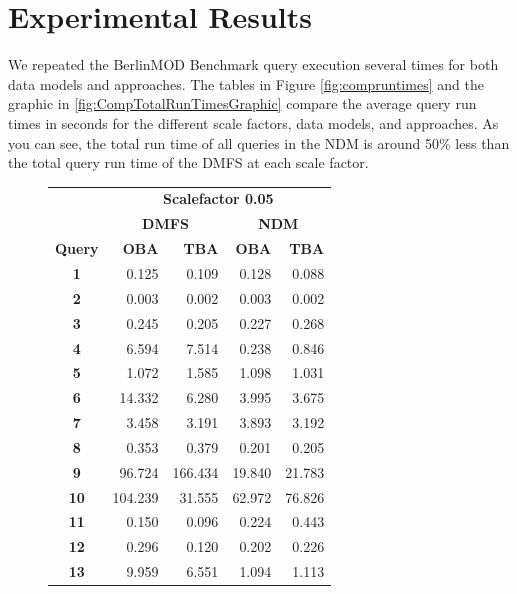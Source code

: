 \documentclass[a4paper]{article}
\newcommand{\bmodb} {BerlinMOD Benchmark}
\begin{document}
{\section{Experimental Results}
\label{sec:results}
We repeated the \bmodb{} query execution several times for both data models and
approaches. The tables in Figure \ref{fig:compruntimes} and the graphic in
\ref{fig:CompTotalRunTimesGraphic} compare the average query run times in seconds
for the different scale factors, data models, and approaches.
As you can see, the total run time of all queries in the NDM is around
50\% less than the total query run time of the DMFS at each scale factor.
\begin{figure}[h]
  \begin{minipage}{0.5\linewidth}
    \begin{tiny}
      \begin{tabular}{|c|r|r|r|r|}
        \hline
        &\multicolumn{4}{c|}{\textbf{Scalefactor 0.05}}\\
        \cline{2-5}
        &\multicolumn{2}{c|}{\textbf{DMFS}}&\multicolumn{2}{c|}{\textbf{NDM}}\\
        \hline
        \textbf{Query}&\textbf{OBA}&\textbf{TBA}&\textbf{OBA}&\textbf{TBA}\\
        \hline
        \textbf{1}&0.125&0.109&0.128&0.088\\
        \hline
        \textbf{2}&0.003&0.002&0.003&0.002\\
        \hline
        \textbf{3}&0.245&0.205&0.227&0.268\\
        \hline
        \textbf{4}&6.594&7.514&0.238&0.846\\
        \hline
        \textbf{5}&1.072&1.585&1.098&1.031\\
        \hline
        \textbf{6}&14.332&6.280&3.995&3.675\\
        \hline
        \textbf{7}&3.458&3.191&3.893&3.192\\
        \hline
        \textbf{8}&0.353&0.379&0.201&0.205\\
        \hline
        \textbf{9}&96.724&166.434&19.840&21.783\\
        \hline
        \textbf{10}&104.239&31.555&62.972&76.826\\
        \hline
        \textbf{11}&0.150&0.096&0.224&0.443\\
        \hline
        \textbf{12}&0.296&0.120&0.202&0.226\\
        \hline
        \textbf{13}&9.959&6.551&1.094&1.113\\

\end{tabular}
\end{tiny}
\end{minipage}
\end{figure}}
\end{document}
